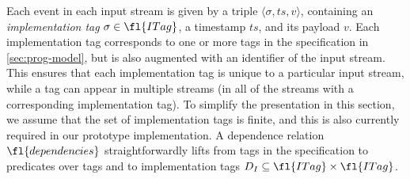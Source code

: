
Each event in each input stream is given by a triple $\langle \sigma, ts, v \rangle$,
containing an \emph{implementation tag}
$\sigma \in \fl{ITag}$, a timestamp $ts$, and its payload $v$.
Each implementation tag corresponds to one or more tags in the specification in \cref{sec:prog-model}, but is also augmented with an identifier of the input stream.
This ensures that each implementation tag is unique to a particular input stream, while a tag can appear in multiple streams (in all of the streams with a corresponding implementation tag).
To simplify the presentation in this section, we assume that the set of implementation tags is finite, and this is also currently required in our prototype implementation.
A dependence relation $\fl{dependencies}$ straightforwardly lifts from tags in the specification to predicates over tags and to implementation tags $D_I \subseteq \fl{ITag} \times \fl{ITag}$.

